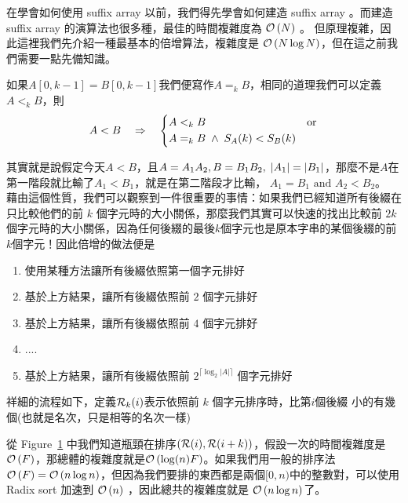 \documentclass[a4paper,12pt]{book}
\begin{document}
在學會如何使用 suffix array 以前，我們得先學會如何建造 suffix array 。而建造 suffix array 的演算法也很多種，最佳的時間複雜度為 $\operatorname{\mathcal{O}}\left(N\right)$ 。
但原理複雜，因此這裡我們先介紹一種最基本的倍增算法，複雜度是 $\operatorname{\mathcal{O}}\left(N \log N \right) $，但在這之前我們需要一點先備知識。
\begin{theorem}[定理]
  如果$A[0, k-1] = B[0, k-1]$我們便寫作$A =_k B$，相同的道理我們可以定義$A <_k B$，則
  \[ A < B  \quad \Rightarrow  \quad
    \begin{dcases}
      A <_k B &  \text{or} \\
      A =_k B \; \land \; S_A(k) < S_B(k)  &
    \end{dcases}
  \]
\end{theorem}
其實就是說假定今天$A < B$，且$A = A_1A_2, B = B_1B_2, \; \lvert A_1 \rvert = \lvert B_1 \rvert$，那麼不是$A$在第一階段就比輸了$A_1 < B_1$，就是在第二階段才比輸， $A_1 = B_1 \text{ and } A_2 < B_2$。\\
藉由這個性質，我們可以觀察到一件很重要的事情：如果我們已經知道所有後綴在只比較他們的前 $k$ 個字元時的大小關係，那麼我們其實可以快速的找出比較前 $2k$ 個字元時的大小關係，因為任何後綴的最後$k$個字元也是原本字串的某個後綴的前$k$個字元！因此倍增的做法便是
\begin{enumerate}
    \item 使用某種方法讓所有後綴依照第一個字元排好
    \item 基於上方結果，讓所有後綴依照前 $2$ 個字元排好
    \item 基於上方結果，讓所有後綴依照前 $4$ 個字元排好
    \item ....
    \item 基於上方結果，讓所有後綴依照前 $2^{\lceil\log_2 |A|\rceil}$ 個字元排好
\end{enumerate}
祥細的流程如下，定義$\operatorname{\mathcal{R}}_k(i)$表示依照前 $k$ 個字元排序時，比第$i$個後綴
小的有幾個(也就是名次，只是相等的名次一樣)
\begin{figure}[H]
  \centering
  \caption{}
  \label{fig:sa1}
\end{figure}
從 Figure~\ref{fig:sa1} 中我們知道瓶頸在排序$(\operatorname{\mathcal{R}}(i), \operatorname{\mathcal{R}}(i+k))$，假設一次的時間複雜度是$\operatorname{\mathcal{O}}\left(F\right)$，那總體的複雜度就是$\operatorname{\mathcal{O}}\left(\log(n) F\right)$。如果我們用一般的排序法$\operatorname{\mathcal{O}}\left(F\right) = \operatorname{\mathcal{O}}\left(n \log n\right)$，但因為我們要排的東西都是兩個$[0, n)$中的整數對，可以使用 Radix sort 加速到 $\operatorname{\mathcal{O}}\left(n\right)$ ，因此總共的複雜度就是  $\operatorname{\mathcal{O}}\left(n \log n\right)$了。
\end{document}
